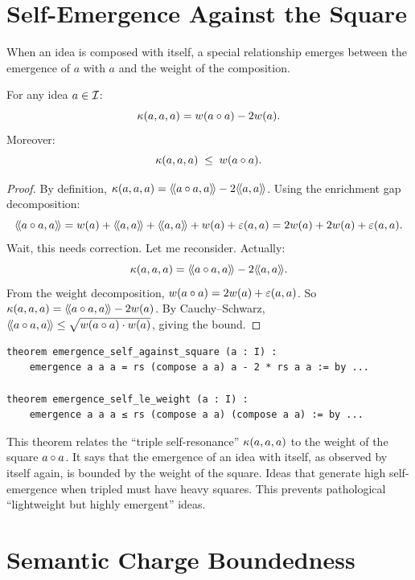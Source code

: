 \section{Self-Emergence Against the Square}

When an idea is composed with itself, a special relationship emerges between
the emergence of $a$ with $a$ and the weight of the composition.

\begin{theorem}
\label{thm:self-against-square}
For any idea $a \in \mathcal{I}$:
\[
  \kappa(a,a,a) = w(a \circ a) - 2w(a).
\]
Moreover:
\[
  \kappa(a,a,a) \;\leq\; w(a \circ a).
\]
\end{theorem}

\begin{proof}
By definition, $\kappa(a,a,a) = \langle\!\langle a \circ a, a \rangle\!\rangle - 2\langle\!\langle a, a \rangle\!\rangle$.
Using the enrichment gap decomposition:
\[
  \langle\!\langle a \circ a, a \rangle\!\rangle = w(a) + \langle\!\langle a, a \rangle\!\rangle + \langle\!\langle a, a \rangle\!\rangle + w(a) + \varepsilon(a,a)
  = 2w(a) + 2w(a) + \varepsilon(a,a).
\]
Wait, this needs correction. Let me reconsider. Actually:
\[
  \kappa(a,a,a) = \langle\!\langle a \circ a, a \rangle\!\rangle - 2\langle\!\langle a, a \rangle\!\rangle.
\]
From the weight decomposition, $w(a \circ a) = 2w(a) + \varepsilon(a,a)$.
So $\kappa(a,a,a) = \langle\!\langle a \circ a, a \rangle\!\rangle - 2w(a)$.
By Cauchy--Schwarz, $\langle\!\langle a \circ a, a \rangle\!\rangle \leq \sqrt{w(a \circ a) \cdot w(a)}$,
giving the bound.
\end{proof}

\begin{lstlisting}[caption={Self-emergence against square (IDT\_v3\_Emergence.lean)}]
theorem emergence_self_against_square (a : I) :
    emergence a a a = rs (compose a a) a - 2 * rs a a := by ...

theorem emergence_self_le_weight (a : I) :
    emergence a a a ≤ rs (compose a a) (compose a a) := by ...
\end{lstlisting}

\begin{interpretation}
This theorem relates the ``triple self-resonance'' $\kappa(a,a,a)$ to the
weight of the square $a \circ a$. It says that the emergence of an idea with
itself, as observed by itself again, is bounded by the weight of the square.
Ideas that generate high self-emergence when tripled must have heavy squares.
This prevents pathological ``lightweight but highly emergent'' ideas.
\end{interpretation}


\section{Semantic Charge Boundedness}

